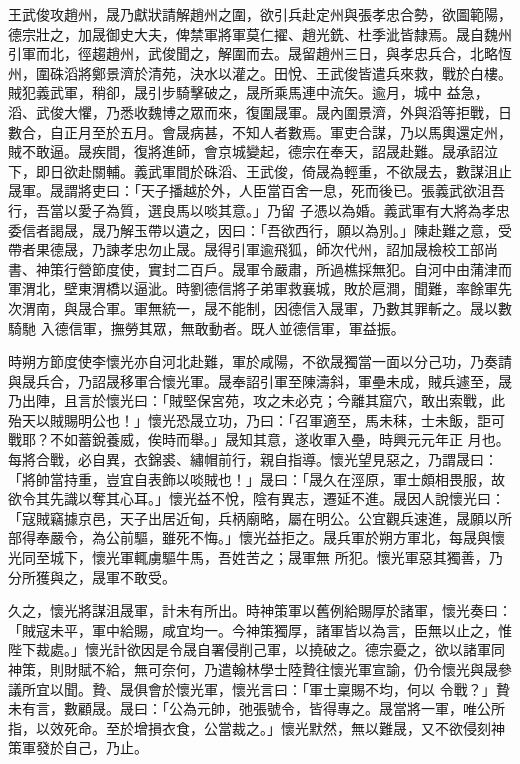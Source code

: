 \begin{pinyinscope}
 王武俊攻趙州，晟乃獻狀請解趙州之圍，欲引兵赴定州與張孝忠合勢，欲圖範陽，德宗壯之，加晟御史大夫，俾禁軍將軍莫仁擢、趙光銑、杜季泚皆隸焉。晟自魏州引軍而北，徑趨趙州，武俊聞之，解圍而去。晟留趙州三日，與孝忠兵合，北略恆州，圍硃滔將鄭景濟於清苑，決水以灌之。田悅、王武俊皆遣兵來救，戰於白樓。賊犯義武軍，稍卻，晟引步騎擊破之，晟所乘馬連中流矢。逾月，城中
 益急，滔、武俊大懼，乃悉收魏博之眾而來，復圍晟軍。晟內圍景濟，外與滔等拒戰，日數合，自正月至於五月。會晟病甚，不知人者數焉。軍吏合謀，乃以馬輿還定州，賊不敢逼。晟疾間，復將進師，會京城變起，德宗在奉天，詔晟赴難。晟承詔泣下，即日欲赴關輔。義武軍間於硃滔、王武俊，倚晟為輕重，不欲晟去，數謀沮止晟軍。晟謂將吏曰：「天子播越於外，人臣當百舍一息，死而後已。張義武欲沮吾行，吾當以愛子為質，選良馬以啖其意。」乃留
 子憑以為婚。義武軍有大將為孝忠委信者謁晟，晟乃解玉帶以遺之，因曰：「吾欲西行，願以為別。」陳赴難之意，受帶者果德晟，乃諫孝忠勿止晟。晟得引軍逾飛狐，師次代州，詔加晟檢校工部尚書、神策行營節度使，實封二百戶。晟軍令嚴肅，所過樵採無犯。自河中由蒲津而軍渭北，壁東渭橋以逼泚。時劉德信將子弟軍救襄城，敗於扈澗，聞難，率餘軍先次渭南，與晟合軍。軍無統一，晟不能制，因德信入晟軍，乃數其罪斬之。晟以數騎馳
 入德信軍，撫勞其眾，無敢動者。既人並德信軍，軍益振。



 時朔方節度使李懷光亦自河北赴難，軍於咸陽，不欲晟獨當一面以分己功，乃奏請與晟兵合，乃詔晟移軍合懷光軍。晟奉詔引軍至陳濤斜，軍壘未成，賊兵遽至，晟乃出陣，且言於懷光曰：「賊堅保宮苑，攻之未必克；今離其窟穴，敢出索戰，此殆天以賊賜明公也！」懷光恐晟立功，乃曰：「召軍適至，馬未秣，士未飯，詎可戰耶？不如蓄銳養威，俟時而舉。」晟知其意，遂收軍入壘，時興元元年正
 月也。每將合戰，必自異，衣錦裘、繡帽前行，親自指導。懷光望見惡之，乃謂晟曰：「將帥當持重，豈宜自表飾以啖賊也！」晟曰：「晟久在涇原，軍士頗相畏服，故欲令其先識以奪其心耳。」懷光益不悅，陰有異志，遷延不進。晟因人說懷光曰：「寇賊竊據京邑，天子出居近甸，兵柄廟略，屬在明公。公宜觀兵速進，晟願以所部得奉嚴令，為公前驅，雖死不悔。」懷光益拒之。晟兵軍於朔方軍北，每晟與懷光同至城下，懷光軍輒虜驅牛馬，吾姓苦之；晟軍無
 所犯。懷光軍惡其獨善，乃分所獲與之，晟軍不敢受。



 久之，懷光將謀沮晟軍，計未有所出。時神策軍以舊例給賜厚於諸軍，懷光奏曰：「賊寇未平，軍中給賜，咸宜均一。今神策獨厚，諸軍皆以為言，臣無以止之，惟陛下裁處。」懷光計欲因是令晟自署侵削己軍，以撓破之。德宗憂之，欲以諸軍同神策，則財賦不給，無可奈何，乃遣翰林學士陸贄往懷光軍宣諭，仍令懷光與晟參議所宜以聞。贄、晟俱會於懷光軍，懷光言曰：「軍士稟賜不均，何以
 令戰？」贄未有言，數顧晟。晟曰：「公為元帥，弛張號令，皆得專之。晟當將一軍，唯公所指，以效死命。至於增損衣食，公當裁之。」懷光默然，無以難晟，又不欲侵刻神策軍發於自己，乃止。




\end{pinyinscope}
